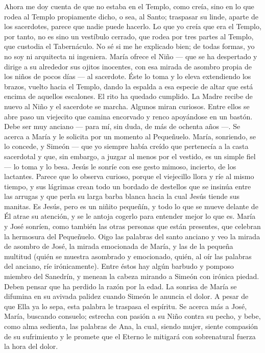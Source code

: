 \documentclass[12pt]{book} %
\begin{document}
Ahora me doy cuenta de que no estaba en el Templo, como creía, sino en lo que rodea al Templo propiamente dicho, o 
sea, al Santo; traspasar su linde, aparte de los sacerdotes, parece que nadie puede hacerlo. Lo que yo creía que era el Templo, por tanto, no es sino un vestíbulo cerrado, que rodea por tres partes al Templo, que custodia el Tabernáculo. No sé si me he explicado bien; de todas formas, yo no soy ni arquitecta ni ingeniera. 
María ofrece el Niño — que se ha despertado y dirige a su alrededor sus ojitos inocentes, con esa mirada de asombro 
propia de los niños de pocos días — al sacerdote. Éste lo toma y lo eleva extendiendo los brazos, vuelto hacia el Templo, dando la espalda a esa especie de altar que está encima de aquellos escalones. El rito ha quedado cumplido. La Madre recibe de nuevo al Niño y el sacerdote se marcha. 
Algunos miran curiosos. Entre ellos se abre paso un viejecito que camina encorvado y renco apoyándose en un bastón. 
Debe ser muy anciano — para mí, sin duda, de más de ochenta años —. Se acerca a María y le solicita por un momento al Pequeñuelo. María, sonriendo, se lo concede, y Simeón — que yo siempre había creído que pertenecía a la casta sacerdotal y que, sin embargo, a juzgar al menos por el vestido, es un simple fiel — lo toma y lo besa. Jesús le sonríe con ese gesto mimoso, incierto, de los lactantes. Parece que lo observa curioso, porque el viejecillo llora y ríe al mismo tiempo, y sus lágrimas crean todo un bordado de destellos que se insinúa entre las arrugas y que perla su larga barba blanca hacia la cual Jesús tiende sus manitas. Es Jesús, pero es un niñito pequeñín, y todo lo que se mueve delante de Él atrae su atención, y se le antoja cogerlo para entender mejor lo que es. María y José sonríen, como también las otras personas que están presentes, que celebran la hermosura del Pequeñuelo. 
Oigo las palabras del santo anciano y veo la mirada de asombro de José, la mirada emocionada de María, y las de la pequeña multitud (quién se muestra asombrado y emocionado, quién, al oír las palabras del anciano, ríe irónicamente). Entre éstos hay algún barbudo y pomposo miembro del Sanedrín, y menean la cabeza mirando a Simeón con irónica piedad. Deben pensar que ha perdido la razón por la edad. 
La sonrisa de María se difumina en su avivada palidez cuando Simeón le anuncia el dolor. A pesar de que Ella ya lo sepa, 
esta palabra le traspasa el espíritu. Se acerca más a José, María, buscando consuelo; estrecha con pasión a su Niño contra su pecho, y bebe, como alma sedienta, las palabras de Ana, la cual, siendo mujer, siente compasión de su sufrimiento y le promete que el Eterno le mitigará con sobrenatural fuerza la hora del dolor. 
\end{document}
